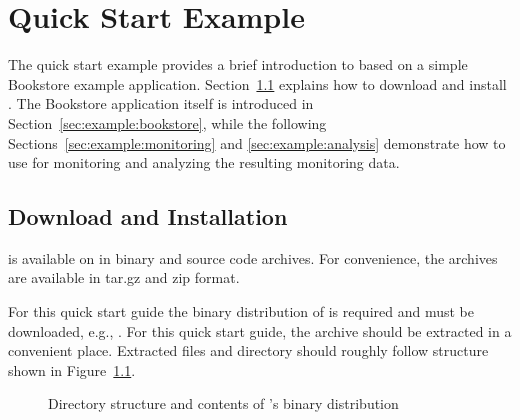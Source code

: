 % 


\chapter{Quick Start Example}\label{chap:example}

The quick start example provides a brief introduction to \Kieker{} based on a simple Bookstore example application. 
Section~\ref{sec:example:downloadInstall} explains how to download and install \Kieker{}. The Bookstore application itself is introduced in Section~\ref{sec:example:bookstore}, while the following Sections~\ref{sec:example:monitoring} and \ref{sec:example:analysis} demonstrate how to use \Kieker{} for monitoring and analyzing the resulting monitoring data.

\section{Download and Installation}\label{sec:example:downloadInstall}

\Kieker{} is available on \KiekerURL{} in binary and source code archives. For convenience, the archives are available in tar.gz and zip format.

For this quick start guide the binary distribution of \Kieker{} is required and must be downloaded, e.g., \file{\binaryFileForDownload}. For this quick start guide, the archive should be extracted in a convenient place. Extracted files and directory should roughly follow structure shown in Figure~\ref{fig:binary-layout}.

\begin{figure}[H]
\begin{graybox}
\end{graybox}
\caption{Directory structure and contents of \Kieker{}'s binary distribution}
\label{fig:binary-layout}
\end{figure}


